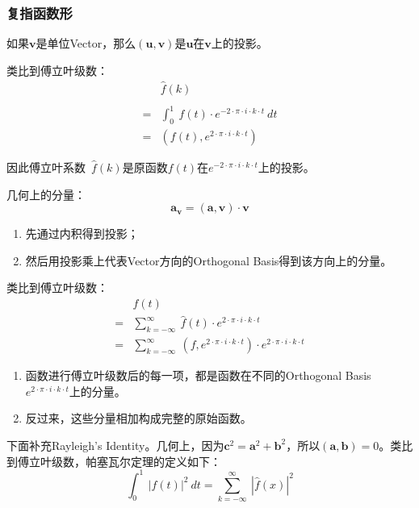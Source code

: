 \subsubsection{复指函数形}
如果$\mathbf{v}$是单位Vector，那么$(\mathbf{u},\mathbf{v})$是$\mathbf{u}$在$\mathbf{v}$上的投影。

类比到傅立叶级数：
\begin{align*}
	  & \hat{f}(k)                                                    \\                                          \\
	= & \int_0^1 \ f(t)\cdot e^{-2\cdot \pi\cdot i\cdot k\cdot t}\ dt \\
	= & (f(t),e^{2\cdot \pi\cdot i\cdot k\cdot t})
\end{align*}

因此傅立叶系数\ $\hat{f}(k)$是原函数$f(t)$在$e^{-2\cdot \pi\cdot i\cdot k\cdot t}$上的投影。

几何上的分量：
$$
	\mathbf{a}_{\mathbf{v}}=(\mathbf{a},\mathbf{v})\cdot \mathbf{v}
$$
\begin{enumerate}
	\item 先通过内积得到投影；
	\item 然后用投影乘上代表Vector方向的Orthogonal Basis得到该方向上的分量。
\end{enumerate}

类比到傅立叶级数：
\begin{align*}
	  & f(t)                                                                                                             \\
	= & \sum\limits_{k=-\infty}^\infty \ \hat{f}(t)\cdot e^{2\cdot \pi\cdot i\cdot k\cdot t}                             \\
	= & \sum\limits_{k=-\infty}^\infty\ (f,e^{2\cdot \pi\cdot i\cdot k\cdot t})\cdot e^{2\cdot \pi\cdot i\cdot k\cdot t}
\end{align*}

\begin{enumerate}
	\item 函数进行傅立叶级数后的每一项，都是函数在不同的Orthogonal Basis$e^{2\cdot \pi\cdot i\cdot k\cdot t}$上的分量。
	\item 反过来，这些分量相加构成完整的原始函数。
\end{enumerate}

下面补充Rayleigh's Identity。几何上，因为$\mathbf{c}^2=\mathbf{a}^2+\mathbf{b}^2$，所以$(\mathbf{a},\mathbf{b})=0$。类比到傅立叶级数，帕塞瓦尔定理的定义如下：
$$
	\int_0^1\ |f(t)|^2\ dt=\sum\limits_{k=-\infty}^{\infty}\ |\hat{f}(x)|^2
$$

